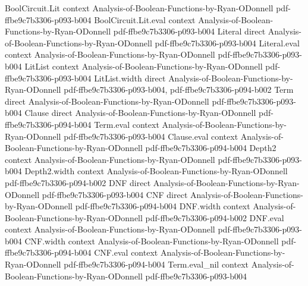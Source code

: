 \begin{theorem}
\leanok
{}
\proofstep
  {BoolCircuit.Lit}
  {context}
  {Analysis-of-Boolean-Functions-by-Ryan-ODonnell}
  {pdf-ffbe9c7b3306-p093-b004}
\proofstep
  {BoolCircuit.Lit.eval}
  {context}
  {Analysis-of-Boolean-Functions-by-Ryan-ODonnell}
  {pdf-ffbe9c7b3306-p093-b004}
\proofstep
  {Literal}
  {direct}
  {Analysis-of-Boolean-Functions-by-Ryan-ODonnell}
  {pdf-ffbe9c7b3306-p093-b004}
\proofstep
  {Literal.eval}
  {context}
  {Analysis-of-Boolean-Functions-by-Ryan-ODonnell}
  {pdf-ffbe9c7b3306-p093-b004}
\proofstep
  {LitList}
  {context}
  {Analysis-of-Boolean-Functions-by-Ryan-ODonnell}
  {pdf-ffbe9c7b3306-p093-b004}
\proofstep
  {LitList.width}
  {direct}
  {Analysis-of-Boolean-Functions-by-Ryan-ODonnell}
  {pdf-ffbe9c7b3306-p093-b004,
    pdf-ffbe9c7b3306-p094-b002}
\proofstep
  {Term}
  {direct}
  {Analysis-of-Boolean-Functions-by-Ryan-ODonnell}
  {pdf-ffbe9c7b3306-p093-b004}
\proofstep
  {Clause}
  {direct}
  {Analysis-of-Boolean-Functions-by-Ryan-ODonnell}
  {pdf-ffbe9c7b3306-p094-b004}
\proofstep
  {Term.eval}
  {context}
  {Analysis-of-Boolean-Functions-by-Ryan-ODonnell}
  {pdf-ffbe9c7b3306-p093-b004}
\proofstep
  {Clause.eval}
  {context}
  {Analysis-of-Boolean-Functions-by-Ryan-ODonnell}
  {pdf-ffbe9c7b3306-p094-b004}
\proofstep
  {Depth2}
  {context}
  {Analysis-of-Boolean-Functions-by-Ryan-ODonnell}
  {pdf-ffbe9c7b3306-p093-b004}
\proofstep
  {Depth2.width}
  {context}
  {Analysis-of-Boolean-Functions-by-Ryan-ODonnell}
  {pdf-ffbe9c7b3306-p094-b002}
\proofstep
  {DNF}
  {direct}
  {Analysis-of-Boolean-Functions-by-Ryan-ODonnell}
  {pdf-ffbe9c7b3306-p093-b004}
\proofstep
  {CNF}
  {direct}
  {Analysis-of-Boolean-Functions-by-Ryan-ODonnell}
  {pdf-ffbe9c7b3306-p094-b004}
\proofstep
  {DNF.width}
  {context}
  {Analysis-of-Boolean-Functions-by-Ryan-ODonnell}
  {pdf-ffbe9c7b3306-p094-b002}
\proofstep
  {DNF.eval}
  {context}
  {Analysis-of-Boolean-Functions-by-Ryan-ODonnell}
  {pdf-ffbe9c7b3306-p093-b004}
\proofstep
  {CNF.width}
  {context}
  {Analysis-of-Boolean-Functions-by-Ryan-ODonnell}
  {pdf-ffbe9c7b3306-p094-b004}
\proofstep
  {CNF.eval}
  {context}
  {Analysis-of-Boolean-Functions-by-Ryan-ODonnell}
  {pdf-ffbe9c7b3306-p094-b004}
\proofstep
  {Term.eval_nil}
  {context}
  {Analysis-of-Boolean-Functions-by-Ryan-ODonnell}
  {pdf-ffbe9c7b3306-p093-b004}

\end{theorem}
